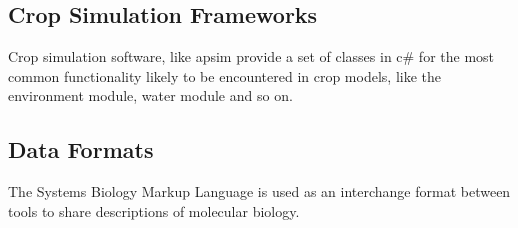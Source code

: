 \documentclass[phd]{infthesis}
\begin{document}
\subsection{Crop Simulation Frameworks}
Crop simulation software, like apsim provide a set of classes in c\# for the most
common functionality likely to be encountered in crop models, like the
environment module, water module and so on.


\subsection{Data Formats}
The Systems Biology Markup Language \citep[SMBL;][]{hucka_systems_2003} is used
as an interchange format between tools to share descriptions of molecular
biology.




\singlespace


\printbibliography[heading=bibintoc]
\end{document}
